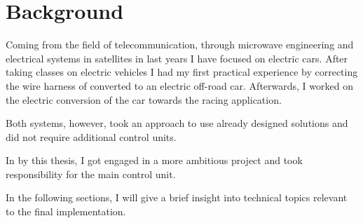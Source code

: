 









\section{Background}
Coming from the field of telecommunication, through microwave engineering and electrical systems in satellites in last years I have focused on electric cars. After taking classes on electric vehicles I had my first practical experience by correcting the wire harness of converted to an electric off-road car. Afterwards, I worked on the electric conversion of the car towards the racing application.

Both systems, however, took an approach to use already designed solutions and did not require additional control units.

In by this thesis, I got engaged in a more ambitious project and took responsibility for the main control unit.

In the following sections, I will give a brief insight into technical topics relevant to the final implementation.

